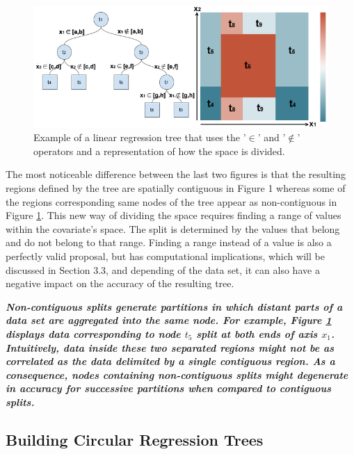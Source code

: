 \documentclass[times,twocolumn,final,authoryear]{elsarticle}
\begin{document}
%
\begin{figure}
  \includegraphics[width=17cm]{fig2_master.png}
\caption{Example of a linear regression tree that uses the '$\in$' and '$\notin$' operators and a representation of how the space is divided.}
\label{f2}       %
\end{figure}
%

The most noticeable difference between the last two figures is that the resulting regions defined by the tree are spatially contiguous in Figure 1 whereas some of the regions corresponding same nodes of the tree appear as non-contiguous in Figure \ref{f2}. This new way of dividing the space requires finding a range of values within the covariate’s space. The split is determined by the values that belong and do not belong to that range. Finding a range instead of a value is also a perfectly valid proposal, but has computational implications, which will be discussed in Section 3.3, and depending of the data set, it can also have a negative impact on the accuracy of the resulting tree.

\textbf{\textit{Non-contiguous splits generate partitions in which distant parts of a data set are aggregated into the same node. For example, Figure \ref{f2} displays data corresponding to node $t_5$ split at both ends of axis $x_1$. Intuitively, data inside these two separated regions might not be as correlated as the data delimited by a single contiguous region. As a consequence, nodes containing non-contiguous splits might degenerate in accuracy for successive partitions when compared to contiguous splits.}}


\subsection{Building Circular Regression Trees}
\end{document}
